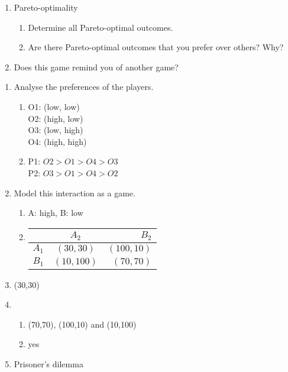 \documentclass[../main.tex]{subfiles}
\begin{document}
\begin{question}
\begin{enumerate}
	\item Pareto-optimality
	\begin{enumerate}
		\item Determine all Pareto-optimal outcomes.
		\item Are there Pareto-optimal outcomes that you prefer over others? Why?
	\end{enumerate}		
		
	\item Does this game remind you of another game?
\end{enumerate}
\end{question}

\begin{solution}
\begin{enumerate}
	\item Analyse the preferences of the players.
	\begin{enumerate}
		\item O1: (low, low)\\
				O2: (high, low)\\
				O3: (low, high)\\
				O4: (high, high)\\
		\item  P1: $O2 > O1 > O4 > O3$ \\
			P2: $O3 > O1 > O4 > O2$
	\end{enumerate}
	\item Model this interaction as a game.
	\begin{enumerate}
		\item A: high, B: low 
		\item	\begin{tabular}{|l|c|r|}
		    	    \hline
		    	    & $A_2$ & $B_2$ \\
		    	    \hline
		    	    $A_1$ & $(30,30)$ & $(100,10)$ \\
		    	    \hline
		    	    $B_1$ & $(10,100)$ & $(70,70)$ \\
		    	    \hline
		    	\end{tabular}
		       
	\end{enumerate}
	
	\item (30,30)
	
	\item 
	\begin{enumerate}
		\item (70,70), (100,10) and (10,100)
		\item yes
	\end{enumerate}		
		
	\item Prisoner's dilemma
\end{enumerate}
\end{solution}
\end{document}
